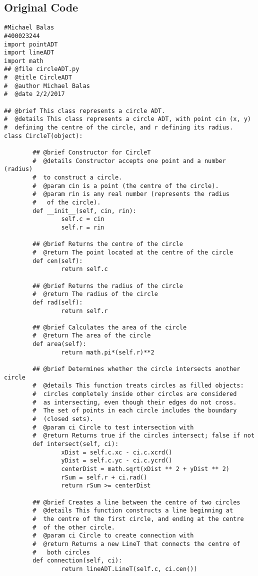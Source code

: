 \documentclass{article}
\begin{document}
\subsection{Original Code}
\begin{lstlisting}
#Michael Balas
#400023244
import pointADT
import lineADT
import math
## @file circleADT.py
#  @title CircleADT
#  @author Michael Balas
#  @date 2/2/2017

## @brief This class represents a circle ADT. 
#  @details This class represents a circle ADT, with point cin (x, y)
#  defining the centre of the circle, and r defining its radius. 
class CircleT(object):

        ## @brief Constructor for CircleT
        #  @details Constructor accepts one point and a number (radius)
        #  to construct a circle.
        #  @param cin is a point (the centre of the circle).
        #  @param rin is any real number (represents the radius 
        #   of the circle).
        def __init__(self, cin, rin):
                self.c = cin
                self.r = rin

        ## @brief Returns the centre of the circle
        #  @return The point located at the centre of the circle
        def cen(self):
                return self.c

        ## @brief Returns the radius of the circle
        #  @return The radius of the circle
        def rad(self):
                return self.r
        
        ## @brief Calculates the area of the circle
        #  @return The area of the circle
        def area(self):
                return math.pi*(self.r)**2
        
        ## @brief Determines whether the circle intersects another circle
        #  @details This function treats circles as filled objects: 
        #  circles completely inside other circles are considered 
        #  as intersecting, even though their edges do not cross. 
        #  The set of points in each circle includes the boundary 
        #  (closed sets).
        #  @param ci Circle to test intersection with
        #  @return Returns true if the circles intersect; false if not         
        def intersect(self, ci):
                xDist = self.c.xc - ci.c.xcrd()
                yDist = self.c.yc - ci.c.ycrd()
                centerDist = math.sqrt(xDist ** 2 + yDist ** 2)
                rSum = self.r + ci.rad()
                return rSum >= centerDist

        ## @brief Creates a line between the centre of two circles
        #  @details This function constructs a line beginning at 
        #  the centre of the first circle, and ending at the centre 
        #  of the other circle.
        #  @param ci Circle to create connection with
        #  @return Returns a new LineT that connects the centre of 
        #   both circles
        def connection(self, ci):
                return lineADT.LineT(self.c, ci.cen())


\end{lstlisting}
\end{document}
